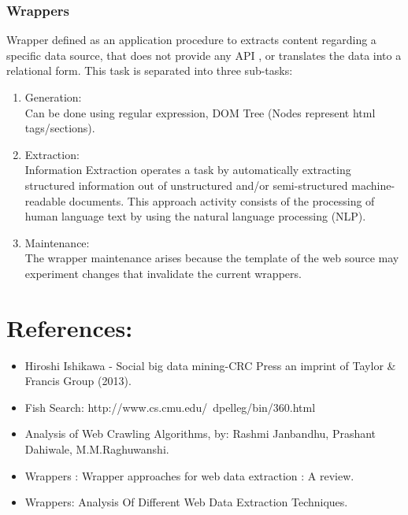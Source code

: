 \documentclass{article}
\begin{document}
\subsubsection{Wrappers}
 Wrapper defined as an application procedure to extracts content regarding a specific data source, that does not provide any API , or translates the data into a relational form. This task is separated into three sub-tasks:
\begin{enumerate}
    \item Generation:\\
        Can be done using regular expression, DOM Tree (Nodes represent html tags/sections).
    \item Extraction:\\
    Information Extraction operates a task by automatically extracting structured information out of unstructured and/or semi-structured machine-readable documents. This approach activity consists of the processing of human language text by using the natural language processing (NLP).
    \item Maintenance:\\
    The wrapper maintenance arises because the template of the web source may experiment changes that invalidate the current wrappers. 
\end{enumerate}









\section{References:}
\begin{itemize}
    \item Hiroshi Ishikawa - Social big data mining-CRC Press an imprint of Taylor \& Francis Group (2013).
    \item Fish Search: http://www.cs.cmu.edu/~dpelleg/bin/360.html
    \item Analysis of Web Crawling Algorithms, by: Rashmi Janbandhu, Prashant Dahiwale, M.M.Raghuwanshi.
    \item Wrappers : Wrapper approaches for web data extraction : A review.
    \item Wrappers: Analysis Of Different Web Data Extraction Techniques.
    
\end{itemize}
\end{document}
